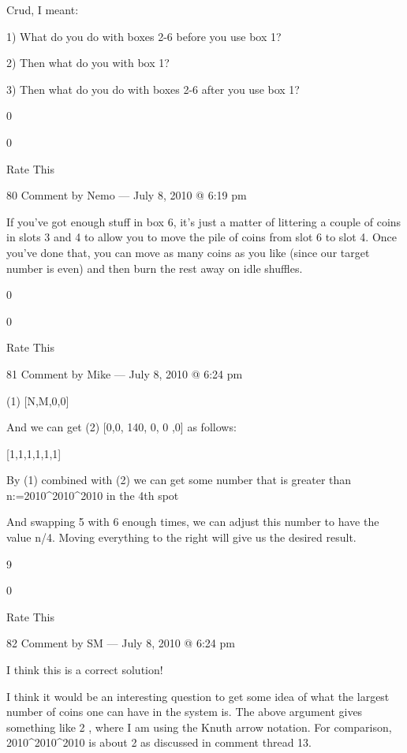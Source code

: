 {        Crud, I meant:

        1) What do you do with boxes 2-6 before you use box 1?

        2) Then what do you with box 1?

        3) Then what do you do with boxes 2-6 after you use box 1?
         
        0
         
        0
         
        Rate This

       80 Comment by Nemo — July 8, 2010 @ 6:19 pm

    If you’ve got enough stuff in box 6, it’s just a matter of
    littering a couple of coins in slots 3 and 4 to allow you to move
    the pile of coins from slot 6 to slot 4. Once you’ve done that,
    you can move as many coins as you like (since our target number is
    even) and then burn the rest away on idle shuffles.
     
    0
     
    0
     
    Rate This

    81 Comment by Mike — July 8, 2010 @ 6:24 pm

    (1) [N,M,0,0] \to [N-1, 1, 0, 2^{M+1}] \to [N-2,2^{M+1}, 0, 0 ]

    And we can get (2) [0,0, 140, 0, 0 ,0] as follows:

    [1,1,1,1,1,1] \to [0,2,2,2,2,3] \to [0,2,1,1,8,3] \to [0,2,1,1,0,19] \to [0,1,19,0,0,0] \to [0,1,1,36,0,0] \to [0,1,1,1,0,140] \to [0,0,140,0,0,0]

    By (1) combined with (2) we can get some number that is greater than n:=2010^{2010^{2010}} in the 4th spot

    And swapping 5 with 6 enough times, we can adjust this number to have the value n/4. Moving everything to the right will give us the desired result.
     
    9
     
    0
     
    Rate This

    82 Comment by SM — July 8, 2010 @ 6:24 pm

        I think this is a correct solution!

        I think it would be an interesting question to get some idea
        of what the largest number of coins one can have in the system
        is. The above argument gives something like 2 \uparrow
        , where I am using the Knuth arrow notation. For
        comparison, 2010^{2010^{2010}} is about 2 \uparrow {}
        as discussed in comment thread 13.

}
